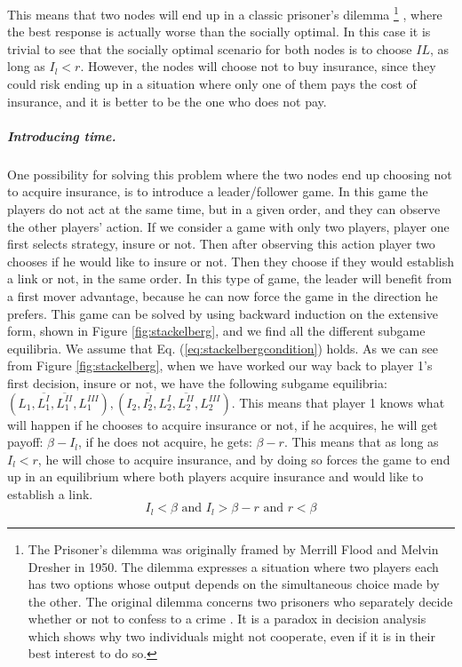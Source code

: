 This means that two nodes will end up in a classic prisoner's dilemma
\footnote{The Prisoner's dilemma was originally framed by Merrill Flood and Melvin Dresher in 1950. The dilemma expresses a situation where two players each has two options whose output depends on the simultaneous choice made by the other. The original dilemma concerns two prisoners who separately decide whether or not to confess to a crime \cite{oxfordPrisonersDilemma}.
It is a paradox in decision analysis which shows why two individuals might not cooperate, even if it is in their best interest to do so.}
, where the best response is actually worse than the socially optimal. In this case it is trivial to see that the socially optimal scenario for both nodes is to choose $IL$, as long as $I_{l}<r$. However, the nodes will choose not to buy insurance, since they could risk ending up in a situation where only one of them pays the cost of insurance, and it is better to be the one who does not pay. 

  
\subparagraph{Introducing time.}
\label{sec:introducing-time}
One possibility for solving this problem where the two nodes end up choosing not to acquire insurance, is to introduce a leader/follower game. 
In this game the players do not act at the same time, but in a given order, and they can observe the other players' action.
If we consider a game with only two players, player one first selects strategy, insure or not. Then after observing this action player two chooses if he would like to insure or not. Then they choose if they would establish a link or not, in the same order.
In this type of game, the leader will benefit from a first mover advantage, because he can now force the game in the direction he prefers.
This game can be solved by using backward induction on the extensive form, shown in Figure \ref{fig:stackelberg}, and we find all the different subgame equilibria. We assume that Eq. (\ref{eq:stackelbergcondition}) holds. As we can see from Figure \ref{fig:stackelberg}, when we have worked our way back to player 1's first decision, insure or not, we have the following subgame equilibria:$(L_{1},\overline{L^{I}_{1}},\overline{L^{II}_{1}},L^{III}_{1}), (I_{2},\overline{I^{I}_{2}},L^{I}_{2},\overline{L^{II}_{2}},L^{III}_{2})$.
This means that player 1 knows what will happen if he chooses to acquire insurance or not, if he acquires, he will get payoff: $\beta-I_{l}$, if he does not acquire, he gets: $\beta-r$. This means that as long as $I_{l}<r$, he will chose to acquire insurance, and by doing so forces the game to end up in an equilibrium where both players acquire insurance and would like to establish a link.
\begin{equation}
I_{l}<\beta \text{ and } I_{l}>\beta-r \text{ and } r<\beta
\label{eq:stackelbergcondition}
\end{equation}

